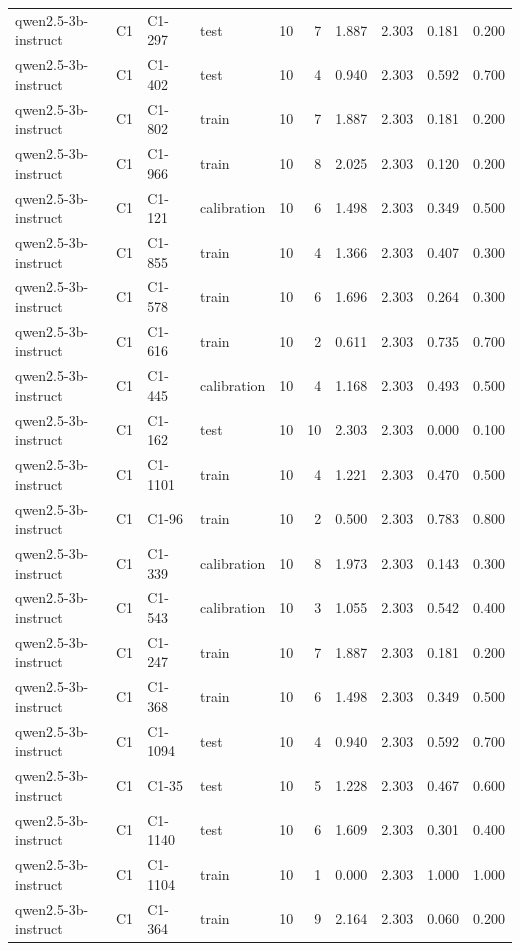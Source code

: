 \begin{table}
\begin{tabular}{llllrrrrrr}
qwen2.5-3b-instruct & C1 & C1-297 & test & 10 & 7 & 1.887 & 2.303 & 0.181 & 0.200 \\
qwen2.5-3b-instruct & C1 & C1-402 & test & 10 & 4 & 0.940 & 2.303 & 0.592 & 0.700 \\
qwen2.5-3b-instruct & C1 & C1-802 & train & 10 & 7 & 1.887 & 2.303 & 0.181 & 0.200 \\
qwen2.5-3b-instruct & C1 & C1-966 & train & 10 & 8 & 2.025 & 2.303 & 0.120 & 0.200 \\
qwen2.5-3b-instruct & C1 & C1-121 & calibration & 10 & 6 & 1.498 & 2.303 & 0.349 & 0.500 \\
qwen2.5-3b-instruct & C1 & C1-855 & train & 10 & 4 & 1.366 & 2.303 & 0.407 & 0.300 \\
qwen2.5-3b-instruct & C1 & C1-578 & train & 10 & 6 & 1.696 & 2.303 & 0.264 & 0.300 \\
qwen2.5-3b-instruct & C1 & C1-616 & train & 10 & 2 & 0.611 & 2.303 & 0.735 & 0.700 \\
qwen2.5-3b-instruct & C1 & C1-445 & calibration & 10 & 4 & 1.168 & 2.303 & 0.493 & 0.500 \\
qwen2.5-3b-instruct & C1 & C1-162 & test & 10 & 10 & 2.303 & 2.303 & 0.000 & 0.100 \\
qwen2.5-3b-instruct & C1 & C1-1101 & train & 10 & 4 & 1.221 & 2.303 & 0.470 & 0.500 \\
qwen2.5-3b-instruct & C1 & C1-96 & train & 10 & 2 & 0.500 & 2.303 & 0.783 & 0.800 \\
qwen2.5-3b-instruct & C1 & C1-339 & calibration & 10 & 8 & 1.973 & 2.303 & 0.143 & 0.300 \\
qwen2.5-3b-instruct & C1 & C1-543 & calibration & 10 & 3 & 1.055 & 2.303 & 0.542 & 0.400 \\
qwen2.5-3b-instruct & C1 & C1-247 & train & 10 & 7 & 1.887 & 2.303 & 0.181 & 0.200 \\
qwen2.5-3b-instruct & C1 & C1-368 & train & 10 & 6 & 1.498 & 2.303 & 0.349 & 0.500 \\
qwen2.5-3b-instruct & C1 & C1-1094 & test & 10 & 4 & 0.940 & 2.303 & 0.592 & 0.700 \\
qwen2.5-3b-instruct & C1 & C1-35 & test & 10 & 5 & 1.228 & 2.303 & 0.467 & 0.600 \\
qwen2.5-3b-instruct & C1 & C1-1140 & test & 10 & 6 & 1.609 & 2.303 & 0.301 & 0.400 \\
qwen2.5-3b-instruct & C1 & C1-1104 & train & 10 & 1 & 0.000 & 2.303 & 1.000 & 1.000 \\
qwen2.5-3b-instruct & C1 & C1-364 & train & 10 & 9 & 2.164 & 2.303 & 0.060 & 0.200 \\

\end{tabular}
\end{table}
